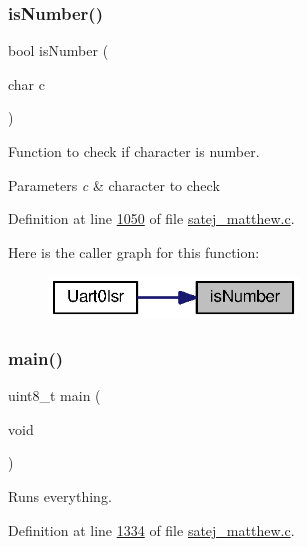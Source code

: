 \subsubsection{\texorpdfstring{isNumber()}{isNumber()}}
{\footnotesize\ttfamily bool is\+Number (\begin{DoxyParamCaption}\item[{char}]{c }\end{DoxyParamCaption})}



Function to check if character is number. 


\begin{DoxyParams}{Parameters}
{\em c} & character to check \\
\hline
\end{DoxyParams}


Definition at line \mbox{\hyperlink{satej__matthew_8c_source_l01050}{1050}} of file \mbox{\hyperlink{satej__matthew_8c_source}{satej\+\_\+matthew.\+c}}.

Here is the caller graph for this function\+:\nopagebreak
\begin{figure}[H]
\begin{center}
\leavevmode
\includegraphics[width=188pt]{satej__matthew_8c_a65b1640156c68ea7687a41428022c1d8_icgraph}
\end{center}
\end{figure}
\mbox{\label{satej__matthew_8c_a922afd31fa147cb51a9b28ce18b3e30e}} 
\subsubsection{\texorpdfstring{main()}{main()}}
{\footnotesize\ttfamily uint8\+\_\+t main (\begin{DoxyParamCaption}\item[{void}]{ }\end{DoxyParamCaption})}



Runs everything. 



Definition at line \mbox{\hyperlink{satej__matthew_8c_source_l01334}{1334}} of file \mbox{\hyperlink{satej__matthew_8c_source}{satej\+\_\+matthew.\+c}}.

